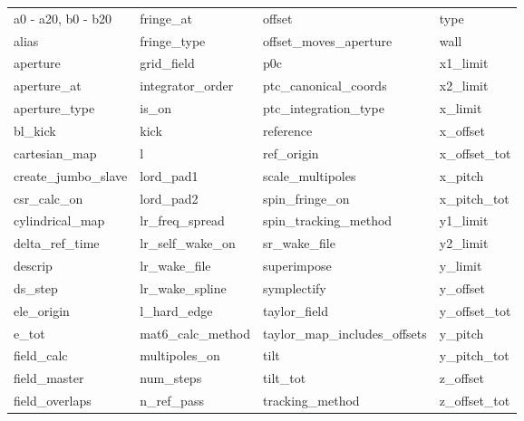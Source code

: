  \begin{tabular}{llll} \toprule
a0 - a20, b0 - b20          & fringe_at                   & offset                      & type                        \\
alias                       & fringe_type                 & offset_moves_aperture       & wall                        \\
aperture                    & grid_field                  & p0c                         & x1_limit                    \\
aperture_at                 & integrator_order            & ptc_canonical_coords        & x2_limit                    \\
aperture_type               & is_on                       & ptc_integration_type        & x_limit                     \\
bl_kick                     & kick                        & reference                   & x_offset                    \\
cartesian_map               & l                           & ref_origin                  & x_offset_tot                \\
create_jumbo_slave          & lord_pad1                   & scale_multipoles            & x_pitch                     \\
csr_calc_on                 & lord_pad2                   & spin_fringe_on              & x_pitch_tot                 \\
cylindrical_map             & lr_freq_spread              & spin_tracking_method        & y1_limit                    \\
delta_ref_time              & lr_self_wake_on             & sr_wake_file                & y2_limit                    \\
descrip                     & lr_wake_file                & superimpose                 & y_limit                     \\
ds_step                     & lr_wake_spline              & symplectify                 & y_offset                    \\
ele_origin                  & l_hard_edge                 & taylor_field                & y_offset_tot                \\
e_tot                       & mat6_calc_method            & taylor_map_includes_offsets & y_pitch                     \\
field_calc                  & multipoles_on               & tilt                        & y_pitch_tot                 \\
field_master                & num_steps                   & tilt_tot                    & z_offset                    \\
field_overlaps              & n_ref_pass                  & tracking_method             & z_offset_tot                \\
 \bottomrule
 \end{tabular}
 \vfill
 
